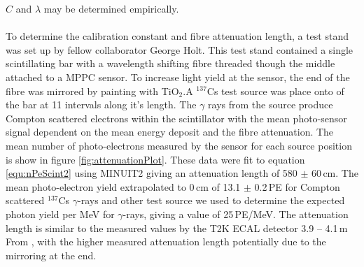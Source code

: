 $C$ and $\lambda$ may be determined empirically.
\\\\To determine the calibration constant and fibre attenuation length, a test stand was set up by fellow collaborator George Holt. This test stand contained a single scintillating bar with a wavelength shifting fibre threaded though the middle attached to a MPPC sensor. To increase light yield at the sensor, the end of the fibre was mirrored by painting with TiO$_2$.A $^{137}$Cs test source was place onto of the bar at 11 intervals along it's length. The $\gamma$ rays from the source produce Compton scattered electrons within the scintillator with the mean photo-sensor signal dependent on the mean energy deposit and the fibre attenuation. The mean number of photo-electrons measured by the sensor for each source position is show in figure \ref{fig:attenuationPlot}. These data were fit to equation \ref{equ:nPeScint2} using MINUIT2 giving an attenuation length of 580 $\pm$ 60\,cm. The mean photo-electron  yield extrapolated to 0\,cm of 13.1 $\pm$ 0.2\,PE for Compton scattered $^{137}$Cs $\gamma$-rays and other test source we used to determine the expected photon yield per MeV for $\gamma$-rays, giving a value of 25\,PE/MeV. The attenuation length is similar to the measured values by the T2K ECAL detector 3.9 -- 4.1\,m From \cite{Allan_2013}, with the higher measured attenuation length potentially due to the mirroring at the end.


